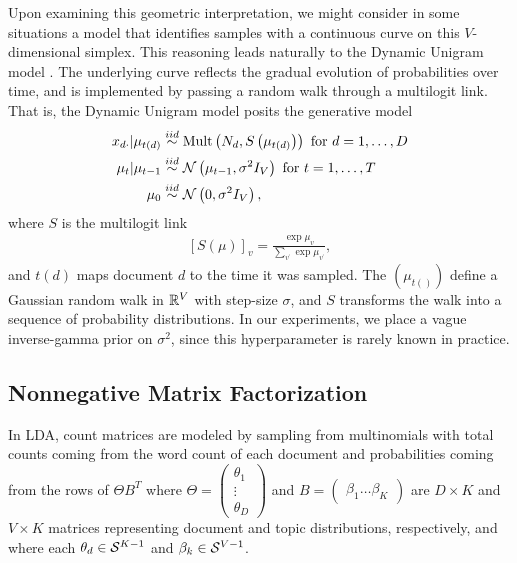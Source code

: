\documentclass[oupdraft]{bio}
\begin{document}
Upon examining this geometric interpretation, we might consider in some
situations a model that identifies samples with a continuous curve on this
$V$-dimensional simplex. This reasoning leads naturally to the Dynamic
Unigram model \citep{blei2006dynamic}. The underlying curve reflects the gradual evolution
of probabilities over time, and is implemented by passing a random walk through
a multilogit link. That is, the Dynamic Unigram model posits the generative
model
\begin{align*}
x_{d\cdot} \vert \mu_{t\left(d\right)}  &\overset{iid}{\sim} \textnormal{Mult}\left(N_{d}, S\left(\mu_{t\left(d\right)}\right)\right) \text{ for } d = 1, \dots, D\\
\mu_{t} \vert \mu_{t - 1} &\overset{iid}{\sim} \mathcal{N}\left(\mu_{t - 1}, \sigma^{2}I_{V}\right) \text{ for } t = 1, \dots, T \\
\mu_{0} &\overset{iid}{\sim} \mathcal{N}\left(0, \sigma^{2}I_{V}\right),
\end{align*}
where $S$ is the multilogit link
\begin{align*}
\left[S\left(\mu\right)\right]_{v} = \frac{\exp{\mu_{v}}}{\sum_{v^{\prime}} \exp{\mu_{v^{\prime}}}},
\end{align*}
and $t\left(d\right)$ maps document $d$ to the time it was sampled. The
$\left(\mu_{t\left(\right)}\right)$ define a Gaussian random walk in
$\mathbb{R}^{V}$ with step-size $\sigma$, and $S$ transforms the walk into a
sequence of probability distributions. In our experiments, we place a vague
inverse-gamma prior on $\sigma^{2}$, since this hyperparameter is rarely known
in practice.

\subsection{Nonnegative Matrix Factorization}
\label{sec:nmf}

In LDA, count matrices are modeled by sampling from multinomials with total
counts coming from the word count of each document and probabilities
coming from the rows of $\Theta B^{T}$ where $\Theta = \begin{pmatrix}\theta_{1}
  \\ \vdots \\ \theta_{D} \end{pmatrix}$ and $B = \begin{pmatrix} \beta_{1}
  \dots \beta_{K} \end{pmatrix}$ are $D \times K$ and $V \times K$ matrices
representing document and topic distributions, respectively, and where each
$\theta_{d} \in \mathcal{S}^{K - 1}$ and $\beta_{k} \in \mathcal{S}^{V - 1}$.
\end{document}
